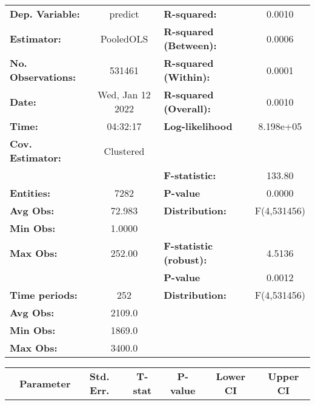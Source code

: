 \begin{center}
\begin{tabular}{lclc}
\toprule
\textbf{Dep. Variable:}    &      predict       & \textbf{  R-squared:         }   &      0.0010      \\
\textbf{Estimator:}        &     PooledOLS      & \textbf{  R-squared (Between):}  &      0.0006      \\
\textbf{No. Observations:} &       531461       & \textbf{  R-squared (Within):}   &      0.0001      \\
\textbf{Date:}             &  Wed, Jan 12 2022  & \textbf{  R-squared (Overall):}  &      0.0010      \\
\textbf{Time:}             &      04:32:17      & \textbf{  Log-likelihood     }   &    8.198e+05     \\
\textbf{Cov. Estimator:}   &     Clustered      & \textbf{                     }   &                  \\
\textbf{}                  &                    & \textbf{  F-statistic:       }   &      133.80      \\
\textbf{Entities:}         &        7282        & \textbf{  P-value            }   &      0.0000      \\
\textbf{Avg Obs:}          &       72.983       & \textbf{  Distribution:      }   &   F(4,531456)    \\
\textbf{Min Obs:}          &       1.0000       & \textbf{                     }   &                  \\
\textbf{Max Obs:}          &       252.00       & \textbf{  F-statistic (robust):} &      4.5136      \\
\textbf{}                  &                    & \textbf{  P-value            }   &      0.0012      \\
\textbf{Time periods:}     &        252         & \textbf{  Distribution:      }   &   F(4,531456)    \\
\textbf{Avg Obs:}          &       2109.0       & \textbf{                     }   &                  \\
\textbf{Min Obs:}          &       1869.0       & \textbf{                     }   &                  \\
\textbf{Max Obs:}          &       3400.0       & \textbf{                     }   &                  \\
\bottomrule
\end{tabular}
\begin{tabular}{lcccccc}
                & \textbf{Parameter} & \textbf{Std. Err.} & \textbf{T-stat} & \textbf{P-value} & \textbf{Lower CI} & \textbf{Upper CI}  \\

\end{tabular}
\end{center}
